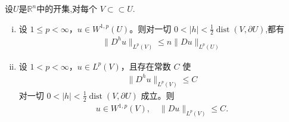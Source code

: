 \documentclass[../../main.tex]{subfiles}
\begin{document}
\begin{theorem}[差商与弱导数]\label{theorem:ch05-差商弱导数}
设$U$是$\mathbb{R}^n$中的开集,对每个 $V\subset \subset U$.
\begin{enumerate}[(i)]
\item 设 $1\leqslant p<\infty$，$u\in W^{1,p}(U)$。则对一切 $0<|h|<\frac{1}{2}\operatorname{dist}(V,\partial U)$,都有
\begin{align}
\|D^{h}u\|_{L^{p}(V)}\leqslant n\|Du\|_{L^{p}(U)}
\end{align}

\item 设 $1<p<\infty$，$u\in L^{p}(V)$，且存在常数 $C$ 使
\begin{align}\label{eq::jijiowjiwiw23323rwe}
\|D^{h}u\|_{L^{p}(V)}\leqslant C
\end{align}
对一切 $0<|h|<\frac{1}{2}\operatorname{dist}(V,\partial U)$ 成立。则
\begin{align*}
u\in W^{1,p}(V),\quad
\|Du\|_{L^p(V)}\leqslant C.
\end{align*}
\end{enumerate}
\end{theorem}
\end{document}
